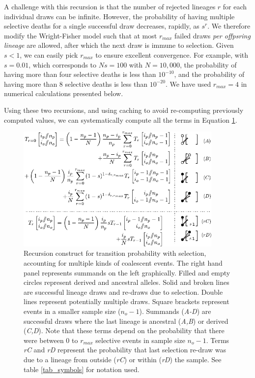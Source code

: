 \documentclass[review]{elsarticle}
\begin{document}
A challenge with this recursion is that the number of rejected lineages $r$ for each individual draws 
can be infinite.
 However, the probability of having multiple selective deaths for a single successful draw decreases,
rapidly, as $s^r.$ We therefore modify the Wright-Fisher model such that at most $r_{max}$ failed
draws \emph{per offpsring lineage} are allowed, after which the next draw is immune to selection. Given
$s<1$, we can easily pick $r_{max}$ to ensure excellent convergence. For example, with $s=0.01$, 
which corresponds to $Ns=100$ with $N=10,000$, the probability of having more than 
four selective deaths is less than $10^{-10}$, and the probability of having more than 8 selective deaths is 
less than $10^{-20}.$ We have used $r_{max}=4$ in numerical calculations presented below. 

Using these two recursions, and using caching to avoid re-computing previously computed values,
we can systematically compute all the terms in Equation \ref{fig_rec_selection_dynamic_fail}.

\begin{figure}
  \centering
  \includegraphics[width=0.9\textwidth]{fig/recurrence-selection-dynamic-failures-annotated.pdf}

  \caption{Recursion construct for transition probability with selection, accounting for multiple
    kinds of coalescent events. The right hand panel represents summands on the left graphically.
    Filled and empty circles represent derived and ancestral alleles. Solid and broken lines are
    successful lineage draws and re-draws due to selection. Double lines represent potentially
    multiple draws. Square brackets represent events in a smaller sample size ($n_o-1$). Summands
    (\textit{A-D}) are successful draws where the last lineage is ancestral (\textit{A,B}) or
    derived (\textit{C,D}). Note that these terms depend on the probability that there were between
    $0$ to $r_{max}$ selective events in sample size $n_o-1$. Terms \textit{rC} and \textit{rD}
    represent the probability that last selection re-draw was due to a lineage from outside
    (\textit{rC}) or within (\textit{rD}) the sample. See table \ref{tab_symbols} for notation used.
  }

  \label{fig_rec_selection_dynamic_fail}
\end{figure}
 
\end{document}
